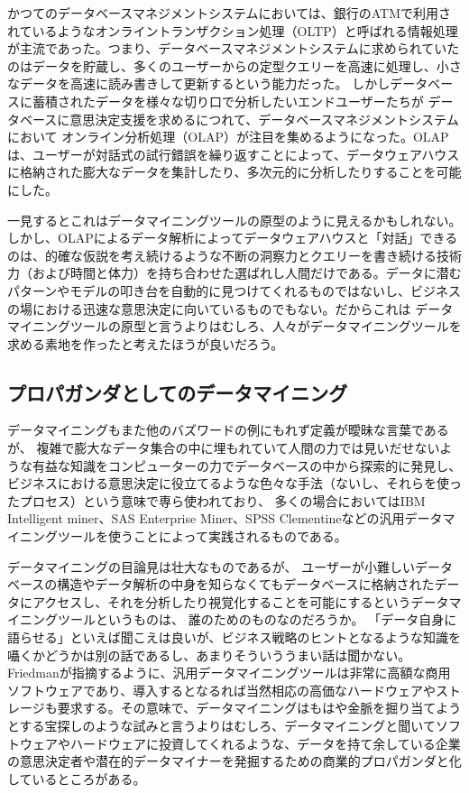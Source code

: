 かつてのデータベースマネジメントシステムにおいては、銀行のATMで利用されているようなオンライントランザクション処理（OLTP）と呼ばれる情報処理が主流であった。つまり、データベースマネジメントシステムに求められていたのはデータを貯蔵し、多くのユーザーからの定型クエリーを高速に処理し、小さなデータを高速に読み書きして更新するという能力だった。
しかしデータベースに蓄積されたデータを様々な切り口で分析したいエンドユーザーたちが
データベースに意思決定支援を求めるにつれて、データベースマネジメントシステムにおいて
オンライン分析処理（OLAP）が注目を集めるようになった。OLAPは、ユーザーが対話式の試行錯誤を繰り返すことによって、データウェアハウスに格納された膨大なデータを集計したり、多次元的に分析したりすることを可能にした。

一見するとこれはデータマイニングツールの原型のように見えるかもしれない。しかし、OLAPによるデータ解析によってデータウェアハウスと「対話」できるのは、的確な仮説を考え続けるような不断の洞察力とクエリーを書き続ける技術力（および時間と体力）を持ち合わせた選ばれし人間だけである。データに潜むパターンやモデルの叩き台を自動的に見つけてくれるものではないし、ビジネスの場における迅速な意思決定に向いているものでもない。だからこれは
データマイニングツールの原型と言うよりはむしろ、人々がデータマイニングツールを求める素地を作ったと考えたほうが良いだろう。

\subsection{プロパガンダとしてのデータマイニング}
データマイニングもまた他のバズワードの例にもれず定義が曖昧な言葉であるが、
複雑で膨大なデータ集合の中に埋もれていて人間の力では見いだせないような有益な知識をコンピューターの力でデータベースの中から探索的に発見し、ビジネスにおける意思決定に役立てるような色々な手法（ないし、それらを使ったプロセス）という意味で専ら使われており、
多くの場合においてはIBM Intelligent miner、SAS Enterprise Miner、SPSS Clementineなどの汎用データマイニングツールを使うことによって実践されるものである。

データマイニングの目論見は壮大なものであるが、
ユーザーが小難しいデータベースの構造やデータ解析の中身を知らなくてもデータベースに格納されたデータにアクセスし、それを分析したり視覚化することを可能にするというデータマイニングツールというものは、
誰のためのものなのだろうか。
「データ自身に語らせる」といえば聞こえは良いが、ビジネス戦略のヒントとなるような知識を囁くかどうかは別の話であるし、あまりそういううまい話は聞かない。Friedmanが指摘するように、汎用データマイニングツールは非常に高額な商用ソフトウェアであり、導入するとなるれば当然相応の高価なハードウェアやストレージも要求する。その意味で、データマイニングはもはや金脈を掘り当てようとする宝探しのような試みと言うよりはむしろ、データマイニングと聞いてソフトウェアやハードウェアに投資してくれるような、データを持て余している企業の意思決定者や潜在的データマイナーを発掘するための商業的プロパガンダと化しているところがある。

